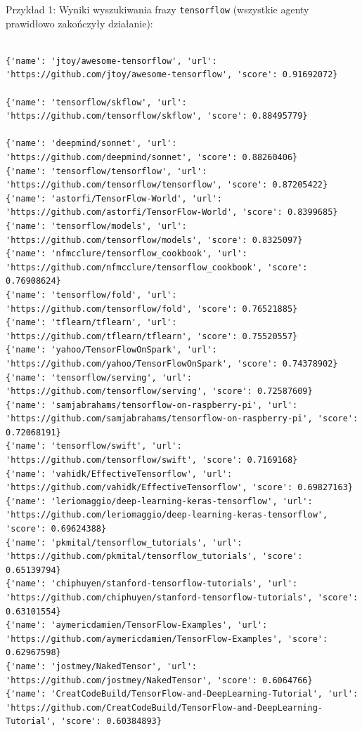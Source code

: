 \documentclass[12pt, oneside, final]{report}
\begin{document}
\begin{landscape}
Przykład 1: Wyniki wyszukiwania frazy \texttt{tensorflow} (wszystkie agenty prawidłowo zakończyły działanie):

\begin{verbatim}

{'name': 'jtoy/awesome-tensorflow', 'url': 'https://github.com/jtoy/awesome-tensorflow', 'score': 0.91692072}

{'name': 'tensorflow/skflow', 'url': 'https://github.com/tensorflow/skflow', 'score': 0.88495779}

{'name': 'deepmind/sonnet', 'url': 'https://github.com/deepmind/sonnet', 'score': 0.88260406}
{'name': 'tensorflow/tensorflow', 'url': 'https://github.com/tensorflow/tensorflow', 'score': 0.87205422}
{'name': 'astorfi/TensorFlow-World', 'url': 'https://github.com/astorfi/TensorFlow-World', 'score': 0.8399685}
{'name': 'tensorflow/models', 'url': 'https://github.com/tensorflow/models', 'score': 0.8325097}
{'name': 'nfmcclure/tensorflow_cookbook', 'url': 'https://github.com/nfmcclure/tensorflow_cookbook', 'score': 0.76908624}
{'name': 'tensorflow/fold', 'url': 'https://github.com/tensorflow/fold', 'score': 0.76521885}
{'name': 'tflearn/tflearn', 'url': 'https://github.com/tflearn/tflearn', 'score': 0.75520557}
{'name': 'yahoo/TensorFlowOnSpark', 'url': 'https://github.com/yahoo/TensorFlowOnSpark', 'score': 0.74378902}
{'name': 'tensorflow/serving', 'url': 'https://github.com/tensorflow/serving', 'score': 0.72587609}
{'name': 'samjabrahams/tensorflow-on-raspberry-pi', 'url': 'https://github.com/samjabrahams/tensorflow-on-raspberry-pi', 'score': 0.72068191}
{'name': 'tensorflow/swift', 'url': 'https://github.com/tensorflow/swift', 'score': 0.7169168}
{'name': 'vahidk/EffectiveTensorflow', 'url': 'https://github.com/vahidk/EffectiveTensorflow', 'score': 0.69827163}
{'name': 'leriomaggio/deep-learning-keras-tensorflow', 'url': 'https://github.com/leriomaggio/deep-learning-keras-tensorflow', 'score': 0.69624388}
{'name': 'pkmital/tensorflow_tutorials', 'url': 'https://github.com/pkmital/tensorflow_tutorials', 'score': 0.65139794}
{'name': 'chiphuyen/stanford-tensorflow-tutorials', 'url': 'https://github.com/chiphuyen/stanford-tensorflow-tutorials', 'score': 0.63101554}
{'name': 'aymericdamien/TensorFlow-Examples', 'url': 'https://github.com/aymericdamien/TensorFlow-Examples', 'score': 0.62967598}
{'name': 'jostmey/NakedTensor', 'url': 'https://github.com/jostmey/NakedTensor', 'score': 0.6064766}
{'name': 'CreatCodeBuild/TensorFlow-and-DeepLearning-Tutorial', 'url': 'https://github.com/CreatCodeBuild/TensorFlow-and-DeepLearning-Tutorial', 'score': 0.60384893}

\end{verbatim}
\end{landscape}
\end{document}

